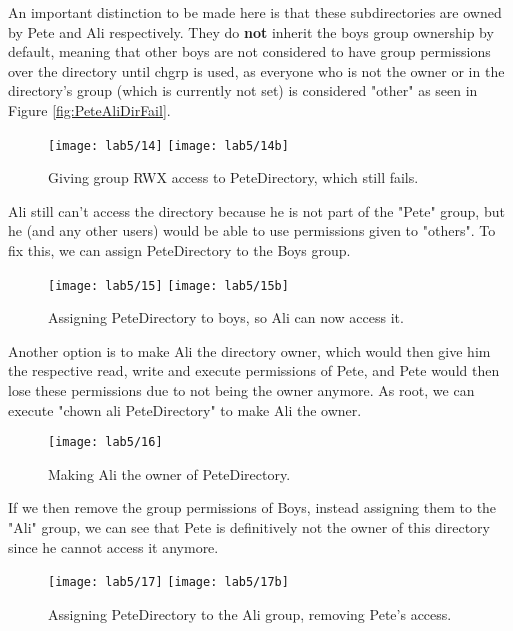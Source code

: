 An important distinction to be made here is that these subdirectories are owned by Pete and
Ali respectively.
They do \textbf{not} inherit the boys group ownership by default, meaning that other boys
are not considered to have group permissions over the directory until chgrp is used, as everyone who is not the owner
or in the directory's group (which is currently not set)
is considered "other" as seen in Figure \ref{fig:PeteAliDirFail}.

\begin{figure}[H]
    \centering
    \texttt{[image: lab5/14]}
    \texttt{[image: lab5/14b]}
    \caption{Giving group RWX access to PeteDirectory, which still fails.}
    \label{fig:PeteDirFail}
\end{figure}

Ali still can't access the directory because he is not part of the "Pete" group, but he
(and any other users) would be able to use permissions given to "others".
To fix this, we can assign PeteDirectory to the Boys group.

\begin{figure}[H]
    \centering
    \texttt{[image: lab5/15]}
    \texttt{[image: lab5/15b]}
    \caption{Assigning PeteDirectory to boys, so Ali can now access it.}
    \label{fig:PeteDirBoys}
\end{figure}


Another option is to make Ali the directory owner, which would then give him the respective read, write
and execute permissions of Pete, and Pete would then lose these permissions due to not being the owner
anymore.
As root, we can execute "chown ali PeteDirectory" to make Ali the owner.

\begin{figure}[H]
    \centering
    \texttt{[image: lab5/16]}
    \caption{Making Ali the owner of PeteDirectory.}
    \label{fig:PeteDirChown}
\end{figure}

If we then remove the group permissions of Boys, instead assigning them to the "Ali" group, we can see
that Pete is definitively not the owner of this directory since he cannot access it anymore.

\begin{figure}[H]
    \centering
    \texttt{[image: lab5/17]}
    \texttt{[image: lab5/17b]}
    \caption{Assigning PeteDirectory to the Ali group, removing Pete's access.}
    \label{fig:PeteDirAli}
\end{figure}








